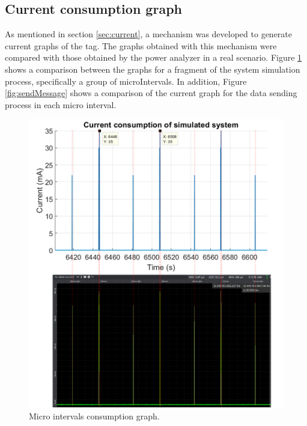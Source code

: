 \documentclass[journal]{IEEEtran}	%
\begin{document}
\subsection{Current consumption graph}

As mentioned in section \ref{sec:current}, a mechanism was developed to generate current graphs of the tag. The graphs obtained with this mechanism were compared with those obtained by the power analyzer in a real scenario. Figure \ref{fig:microIntervals} shows a comparison between the graphs for a fragment of the system simulation process, specifically a group of microIntervals. In addition, Figure \ref{fig:sendMessage} shows a comparison of the current graph for the data sending process in each micro interval.

\begin{figure}[t]
\centering
\includegraphics[width=0.99\columnwidth]{microIntervalsAll.png}
\caption{Micro intervals consumption graph.}
\label{fig:microIntervals}
\end{figure}
\end{document}
